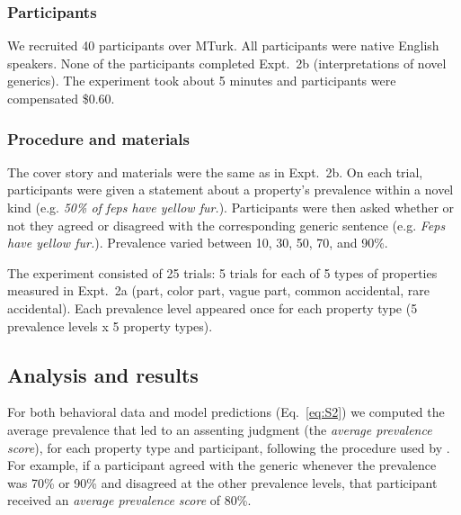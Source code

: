 \documentclass[12pt,letterpaper]{article}
\begin{document}
\subsubsection*{Participants}

We recruited 40 participants over MTurk.  
All participants were native English speakers. 
None of the participants completed Expt.~2b (interpretations of novel generics).
The experiment took about 5 minutes and participants were compensated \$0.60.

\subsubsection*{Procedure and materials}

The cover story and materials were the same as in Expt.~2b.
On each trial, participants were given a statement about a property's prevalence within a novel kind (e.g. \emph{50\% of feps have yellow fur.}). Participants were then asked whether or not they agreed or disagreed with the corresponding generic sentence (e.g. \emph{Feps have yellow fur.}). Prevalence varied between 10, 30, 50, 70, and 90\%.

The experiment consisted of 25 trials: 5 trials for each of 5 types of properties measured in Expt.~2a (part, color part, vague part, common accidental, rare accidental). 
Each prevalence level appeared once for each property type (5 prevalence levels x 5 property types). 

\subsection*{Analysis and results}

For both behavioral data and model predictions (Eq.~\ref{eq:S2}) we computed the average prevalence that led to an assenting judgment (the \emph{average prevalence score}), for each property type and participant, following the procedure used by .
For example, if a participant agreed with the generic whenever the prevalence was 70\% or 90\% and disagreed at the other prevalence levels, that participant received an \emph{average prevalence score} of 80\%.
\end{document}
